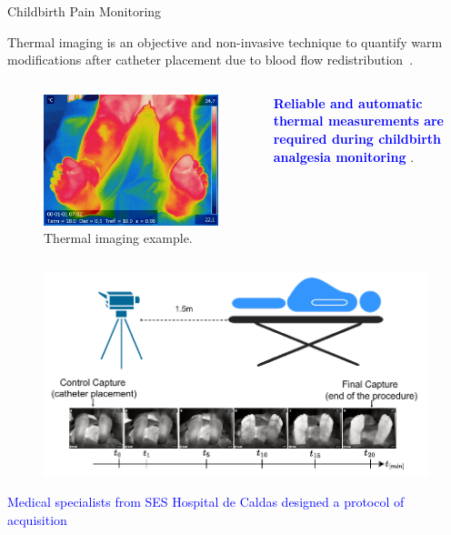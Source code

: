 \documentclass[aspectratio=169]{beamer}
\let\oldcite\cite %
\renewcommand{\cite}[1]{{\tiny\oldcite{#1}}}
\begin{document}
\begin{frame}[allowframebreaks]{Childbirth Pain Monitoring}

Thermal imaging is an objective and non-invasive technique to quantify warm modifications after catheter placement due to blood flow redistribution~{\tiny{\cite{2143r23}}}. 

\begin{columns}

\begin{figure}
    \centering
    \includegraphics[width=0.8\linewidth]{Figures/t20rainbow.jpg}
    \caption{Thermal imaging example.}
\end{figure}



\textcolor{blue}{\textbf{Reliable and automatic thermal measurements are required during childbirth analgesia monitoring}} {\tiny{\cite{PMID:25232864}}}.


\end{columns}

\framebreak

\begin{figure}
    \centering
    \includegraphics[width=0.7\linewidth]{Figures/camaraLocation.pdf}
\end{figure}

\begin{center}
    \textcolor{blue}{Medical specialists from SES Hospital de Caldas designed a protocol of acquisition}
\end{center}
\end{frame}
\end{document}
